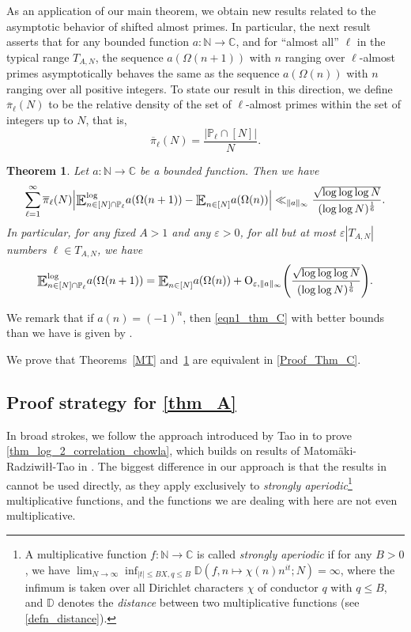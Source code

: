 \documentclass[letter,11pt]{article}
\theoremstyle{plain} %
\theoremstyle{definition} %
\theoremstyle{plain}
\newcounter{MainTheoremCounter}
\newtheorem{maintheorem}[MainTheoremCounter]{Theorem}
\theoremstyle{plain}
\theoremstyle{plain}
\numberwithin{equation}{section}
\newcommand{\Matomaki}{Matom\"{a}ki}
\newcommand{\Radziwill}{Radziwi\l\l{}}
\newcommand{\Oh}{{\mathrm O}}
\newcommand{\N}{\mathbb{N}}
\newcommand{\C}{\mathbb{C}}
\renewcommand{\epsilon}{\varepsilon}
\renewcommand{\leq}{\leqslant}
\renewcommand{\P}{\mathbb{P}}
\newcommand{\E}{\raisebox{-0.4ex}{\scalebox{1.4}[1.3]{$\mathbb{E}$}}}
\newcommand{\Esub}[1]{\raisebox{-0.4ex}{\scalebox{1.4}[1.3]{$\mathbb{E}$}}\raisebox{-0.35ex}{\ensuremath{_{\scriptstyle #1}}}}
\newcommand{\logE}{{\E}^{\log}}
\newcommand{\Dist}{\mathbb{D}}
\newcommand{\1}{\mathbbm{1}}
\begin{document}
As an application of our main theorem, we obtain new results related to the asymptotic behavior of shifted almost primes. In particular, the next result asserts that for any bounded function $a\colon\N\to\C$, and for ``almost all'' $\ell$ in the typical range $T_{A,N}$, the sequence $a(\Omega(n+1))$ with $n$ ranging over $\ell$-almost primes asymptotically behaves the same as the sequence $a(\Omega(n))$ with $n$ ranging over all positive integers.
To state our result in this direction, we define $\overline{\pi}_\ell(N)$ to be the relative density of the set of $\ell$-almost primes within the set of integers up to $N$, that is,
\begin{equation}\label{pi_defn}
    \overline{\pi}_\ell(N)=\frac{|\P_\ell\cap [N]|}{N}.
\end{equation}

\begin{maintheorem}
\label{thm_C}
Let $a\colon\N\to\C$ be a bounded function. Then we have
\begin{equation}\label{eqn1_thm_C}
    \sum_{\ell=1}^\infty \overline{\pi}_\ell(N)\Big|\logE_{n\in[N]\cap\P_\ell} a(\Omega(n+1)) - \Esub{n\in[N]} a(\Omega(n))\Big|
    \ll_{\|a\|_\infty} \frac{\sqrt{\log\log\log{N}}}{(\log\log{N})^\frac{1}{6}}.
\end{equation}
In particular, for any fixed $A>1$ and any $\epsilon>0$, for all but at most $\epsilon|T_{A,N}|$ numbers $\ell\in T_{A,N}$, we have 
\begin{equation}\label{eqn2_thm_C}
    \logE_{n\in[N]\cap\P_\ell} a(\Omega(n+1)) = \Esub{n\in[N]} a(\Omega(n)) + \Oh_{\epsilon,\|a\|_\infty}\Bigg(\frac{\sqrt{\log\log\log{N}}}{(\log\log{N})^\frac{1}{6}}\Bigg).
\end{equation}
\end{maintheorem}

We remark that if $a(n)=(-1)^n$, then \eqref{eqn1_thm_C} with better bounds than we have is given by \cite[Eq.~(1.16)]{helf_radz}.

We prove that Theorems~\ref{MT} and~\ref{thm_C} are equivalent in \cref{Proof_Thm_C}.


\subsection{Proof strategy for \cref{thm_A}}

In broad strokes, we follow the approach introduced by Tao in \cite{Tao16} to prove \cref{thm_log_2_correlation_chowla}, which builds on results of \Matomaki-\Radziwill-Tao in \cite{MRT15}.
The biggest difference in our approach is that the results in \cite{MRT15} cannot be used directly, as they apply exclusively to \emph{strongly aperiodic}\footnote{A multiplicative function $f\colon\N\to\C$ is called \emph{strongly aperiodic} if for any $B>0$, we have $\lim_{N\to \infty}\inf_{|t|\leq BX,q\leq B}\Dist(f,n\mapsto\chi(n) n^{it};N) = \infty$,
where the infimum is taken over all Dirichlet characters $\chi$ of conductor
$q$ with $q\leq B$, and $\Dist$ denotes the \emph{distance} between two multiplicative functions (see \cref{defn_distance}).} multiplicative functions, and the functions we are dealing with here are not even multiplicative.
\end{document}
